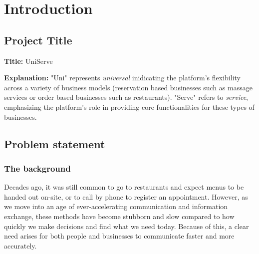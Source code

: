 \documentclass[]{VUMIFTemplateClass}
\begin{document}

\onehalfspacing


\singlespacing
{}


\tableofcontents
\onehalfspacing






\section{Introduction}
\subsection{Project Title}

\textbf{Title:} UniServe

\textbf{Explanation:} "Uni" represents \emph{universal} inidicating the platform's flexibility across a variety of business models 
(reservation based businesses such as massage services or order based businesses such as restaurants). 
"Serve" refers to \emph{service}, emphasizing the platform’s role in providing core functionalities for these types of businesses.

\subsection{Problem statement}

\subsubsection{The background}

Decades ago, it was still common to go to restaurants and expect menus to be handed out on-site, or to call by phone to register an appointment. However, as we move into an age of ever-accelerating communication and information exchange, these methods have become stubborn and slow compared to how quickly we make decisions and find what we need today. Because of this, a clear need arises for both people and businesses to communicate faster and more accurately.
\end{document}
